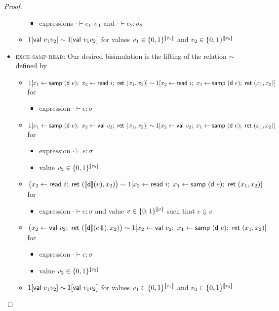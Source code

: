 \begin{proof}
\begin{itemize}
\begin{itemize}
\begin{itemize}
\item expressions $\cdot \vdash e_1 : \sigma_1$ and $\cdot \vdash e_2 : \sigma_2$
\end{itemize}
\item $1[\mathsf{val} \ v_1 v_2] \sim 1[\mathsf{val} \ v_1 v_2]$ for values $v_1 \in \{0,1\}^{\llbracket \tau_1 \rrbracket}$ and $v_2 \in \{0,1\}^{\llbracket \tau_2 \rrbracket}$
\end{itemize}
\item \textsc{exch-samp-read}: Our desired bisimulation is the lifting of the relation $\sim$ defined by
\begin{itemize}
\item $1[x_1 \leftarrow \samp{(\dist \ e)}; \ x_2 \leftarrow \read{i}; \ \ret{(x_1,x_2)}] \sim 1[x_2 \leftarrow \read{i}; \ x_1 \leftarrow \samp{(\dist \ e)}; \ \ret{(x_1,x_2)}]$ for
\begin{itemize}
\item expression $\cdot \vdash e : \sigma$
\end{itemize}
\item $1[x_1 \leftarrow \samp{(\dist \ e)}; \ x_2 \leftarrow \val{v_2}; \ \ret{(x_1,x_2)}] \sim 1[x_2 \leftarrow \val{v_2}; \ x_1 \leftarrow \samp{(\dist \ e)}; \ \ret{(x_1,x_2)}]$ for
\begin{itemize}
\item expression $\cdot \vdash e : \sigma$
\item value $v_2 \in \{0,1\}^{\llbracket \tau_2 \rrbracket}$
\end{itemize}
\item $\big(x_2 \leftarrow \read{i}; \ \ret{(\sem{\dist}(v),x_2)}\big) \sim 1[x_2 \leftarrow \read{i}; \ x_1 \leftarrow \samp{(\dist \ e)}; \ \ret{(x_1,x_2)}]$ for
\begin{itemize}
\item expression $\cdot \vdash e : \sigma$ and value $v \in \{0,1\}^{\llbracket \sigma \rrbracket}$ such that $e \Downarrow v$
\end{itemize}
\item $\big(x_2 \leftarrow \val{v_2}; \ \ret{(\sem{\dist}(\eval{e}),x_2)}\big) \sim 1[x_2 \leftarrow \val{v_2}; \ x_1 \leftarrow \samp{(\dist \ e)}; \ \ret{(x_1,x_2)}]$ for
\begin{itemize}
\item expression $\cdot \vdash e : \sigma$
\item value $v_2 \in \{0,1\}^{\llbracket \tau_2 \rrbracket}$
\end{itemize}
\item $1[\mathsf{val} \ v_1 v_2] \sim 1[\mathsf{val} \ v_1 v_2]$ for values $v_1 \in \{0,1\}^{\llbracket \tau_1 \rrbracket}$ and $v_2 \in \{0,1\}^{\llbracket \tau_2 \rrbracket}$

\end{itemize}
\end{itemize}
\end{proof}
